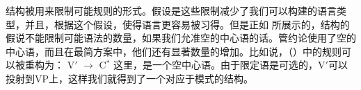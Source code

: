 \xbarc 结构被用来限制可能规则的形式。假设是这些限制减少了我们可以构建的语言类型，并且，根据这个假设，使得语言更容易被习得。但是正如 \citet{KP90a}所展示的，\xbarc 结构的假说不能限制可能语法的数量，如果我们允准空的中心语的话。管约论使用了空的中心语，而且在最简方案\indexmpc 中，他们还有显著数量的增加。比如说，（）中的规则可以被重构为：
\ea
V$'$ $\to$ \vnull C$^*$
\z
这里，\vnullc 是一个空中心语。由于限定语是可选的，V$'$可以投射到VP上，这样我们就得到了一个对应于\xbarc 模式的结构。

